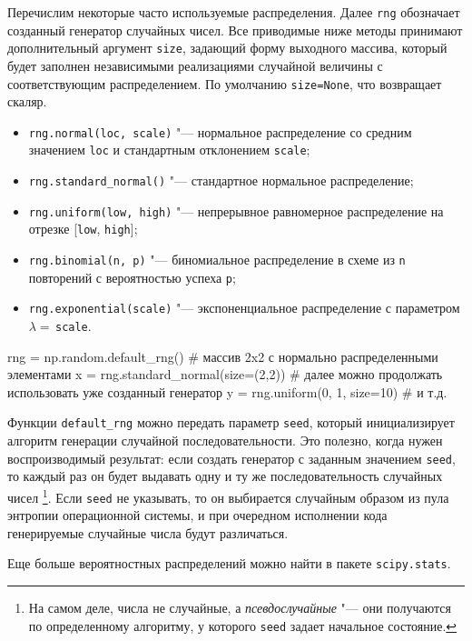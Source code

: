 Перечислим некоторые часто используемые распределения.
Далее \verb"rng" обозначает созданный генератор случайных чисел.
Все приводимые ниже методы принимают дополнительный аргумент \verb"size", задающий форму выходного массива, который будет заполнен независимыми реализациями случайной величины с соответствующим распределением.
По умолчанию \verb"size=None", что возвращает скаляр.
\begin{itemize}
\item \verb"rng.normal(loc, scale)" "--- нормальное распределение со средним значением \verb"loc" и стандартным отклонением \verb"scale";
\item \verb"rng.standard_normal()" "--- стандартное нормальное распределение;
\item \verb"rng.uniform(low, high)" "--- непрерывное равномерное распределение на отрезке [\verb"low", \verb"high"];
\item \verb"rng.binomial(n, p)" "--- биномиальное распределение в схеме из \verb"n" повторений с вероятностью успеха \verb"p";
\item \verb"rng.exponential(scale)" "--- экспоненциальное распределение с параметром $\lambda=$\,\verb"scale".
\end{itemize}

\begin{python}
rng = np.random.default_rng()
# массив 2x2 с нормально распределенными элементами
x = rng.standard_normal(size=(2,2))
# далее можно продолжать использовать уже созданный генератор
y = rng.uniform(0, 1, size=10)
# и т.д.
\end{python}

\begin{remark}
\label{np:r:seed}
Функции \verb"default_rng" можно передать параметр \verb"seed", который инициализирует алгоритм генерации  случайной последовательности.
Это полезно, когда нужен воспроизводимый результат: если создать генератор с заданным значением \verb"seed", то каждый раз он будет выдавать одну и ту же последовательность случайных чисел%
\footnote{На самом деле, числа не случайные, а \emph{псевдослучайные} "--- они получаются по определенному алгоритму, у которого \verb"seed" задает начальное состояние.}.
Если \verb"seed" не указывать, то он выбирается случайным образом из пула энтропии операционной системы, и при очередном исполнении кода генерируемые случайные числа будут различаться.
\end{remark}

\begin{remark}
Еще больше вероятностных распределений можно найти в пакете \verb"scipy.stats".
\end{remark}


